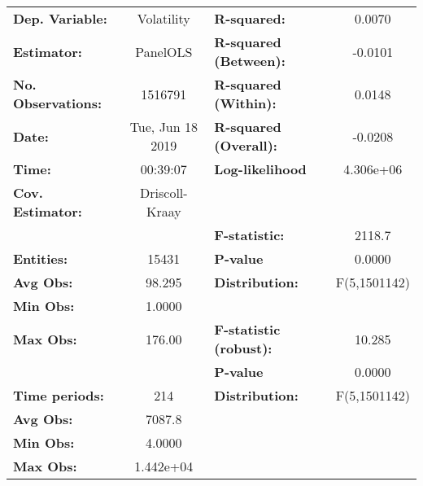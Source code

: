 \begin{center}
\begin{tabular}{lclc}
\toprule
\textbf{Dep. Variable:}                 &     Volatility     & \textbf{  R-squared:         }   &      0.0070      \\
\textbf{Estimator:}                     &      PanelOLS      & \textbf{  R-squared (Between):}  &     -0.0101      \\
\textbf{No. Observations:}              &      1516791       & \textbf{  R-squared (Within):}   &      0.0148      \\
\textbf{Date:}                          &  Tue, Jun 18 2019  & \textbf{  R-squared (Overall):}  &     -0.0208      \\
\textbf{Time:}                          &      00:39:07      & \textbf{  Log-likelihood     }   &    4.306e+06     \\
\textbf{Cov. Estimator:}                &   Driscoll-Kraay   & \textbf{                     }   &                  \\
\textbf{}                               &                    & \textbf{  F-statistic:       }   &      2118.7      \\
\textbf{Entities:}                      &       15431        & \textbf{  P-value            }   &      0.0000      \\
\textbf{Avg Obs:}                       &       98.295       & \textbf{  Distribution:      }   &   F(5,1501142)   \\
\textbf{Min Obs:}                       &       1.0000       & \textbf{                     }   &                  \\
\textbf{Max Obs:}                       &       176.00       & \textbf{  F-statistic (robust):} &      10.285      \\
\textbf{}                               &                    & \textbf{  P-value            }   &      0.0000      \\
\textbf{Time periods:}                  &        214         & \textbf{  Distribution:      }   &   F(5,1501142)   \\
\textbf{Avg Obs:}                       &       7087.8       & \textbf{                     }   &                  \\
\textbf{Min Obs:}                       &       4.0000       & \textbf{                     }   &                  \\
\textbf{Max Obs:}                       &     1.442e+04      & \textbf{                     }   &                  \\

\end{tabular}
\end{center}
